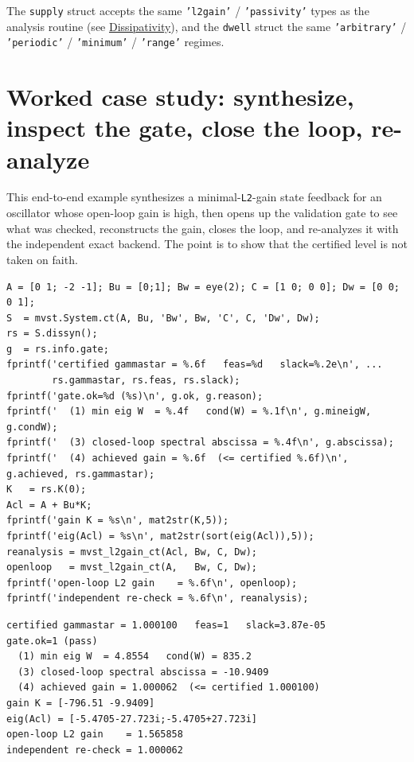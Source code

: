 \documentclass[11pt,oneside]{report}
\newcommand{\code}[1]{\texttt{#1}}
\begin{document}
The \code{supply} struct accepts the same \code{'l2gain'} / \code{'passivity'} types as the
analysis routine (see \protect\hyperlink{chap:07-dissipativity}{Dissipativity}), and the \code{dwell}
struct the same \code{'arbitrary'} / \code{'periodic'} / \code{'minimum'} / \code{'range'} regimes.

\hypertarget{worked-case-study-synthesize-inspect-the-gate-close-the-loop-re-analyze}{%
\section{Worked case study: synthesize, inspect the gate, close the loop, re-analyze}\label{worked-case-study-synthesize-inspect-the-gate-close-the-loop-re-analyze}}

This end-to-end example synthesizes a minimal-\code{L2}-gain state feedback for an
oscillator whose open-loop gain is high, then opens up the validation gate to
see what was checked, reconstructs the gain, closes the loop, and re-analyzes it
with the independent exact backend. The point is to show that the certified
level is not taken on faith.

\begin{lstlisting}[style=matlabstyle]
A = [0 1; -2 -1]; Bu = [0;1]; Bw = eye(2); C = [1 0; 0 0]; Dw = [0 0; 0 1];
S  = mvst.System.ct(A, Bu, 'Bw', Bw, 'C', C, 'Dw', Dw);
rs = S.dissyn();
g  = rs.info.gate;
fprintf('certified gammastar = %.6f   feas=%d   slack=%.2e\n', ...
        rs.gammastar, rs.feas, rs.slack);
fprintf('gate.ok=%d (%s)\n', g.ok, g.reason);
fprintf('  (1) min eig W  = %.4f   cond(W) = %.1f\n', g.mineigW, g.condW);
fprintf('  (3) closed-loop spectral abscissa = %.4f\n', g.abscissa);
fprintf('  (4) achieved gain = %.6f  (<= certified %.6f)\n', g.achieved, rs.gammastar);
K   = rs.K(0);
Acl = A + Bu*K;
fprintf('gain K = %s\n', mat2str(K,5));
fprintf('eig(Acl) = %s\n', mat2str(sort(eig(Acl)),5));
reanalysis = mvst_l2gain_ct(Acl, Bw, C, Dw);
openloop   = mvst_l2gain_ct(A,   Bw, C, Dw);
fprintf('open-loop L2 gain    = %.6f\n', openloop);
fprintf('independent re-check = %.6f\n', reanalysis);
\end{lstlisting}

\begin{lstlisting}[style=outputstyle]
certified gammastar = 1.000100   feas=1   slack=3.87e-05
gate.ok=1 (pass)
  (1) min eig W  = 4.8554   cond(W) = 835.2
  (3) closed-loop spectral abscissa = -10.9409
  (4) achieved gain = 1.000062  (<= certified 1.000100)
gain K = [-796.51 -9.9409]
eig(Acl) = [-5.4705-27.723i;-5.4705+27.723i]
open-loop L2 gain    = 1.565858
independent re-check = 1.000062
\end{lstlisting}
\end{document}
